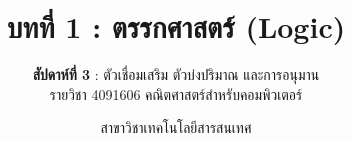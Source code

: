 
\renewcommand{\footchaptertitle}{บทที่ 1 ตรรกศาสตร์ (สัปดาห์ที่ 3)}

\title{\textbf{บทที่ 1 : ตรรกศาสตร์ (Logic)}}
\subtitle{\textbf{สัปดาห์ที่ 3} : ตัวเชื่อมเสริม ตัวบ่งปริมาณ และการอนุมาน \\ รายวิชา 4091606 คณิตศาสตร์สำหรับคอมพิวเตอร์}
\author{สาขาวิชาเทคโนโลยีสารสนเทศ}
\date{}




